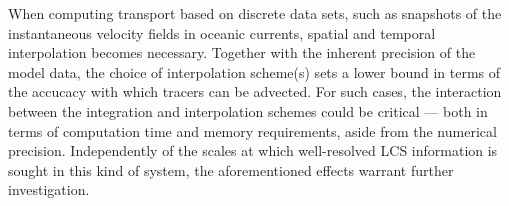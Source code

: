 When computing transport based on discrete data sets, such as snapshots of the
instantaneous velocity fields in oceanic currents, spatial and temporal
interpolation becomes necessary. Together with the inherent precision of the
model data, the choice of interpolation scheme(s) sets a lower bound
in terms of the accucacy with which tracers can be advected. For such cases,
the interaction between the integration and interpolation schemes could
be critical --- both in terms of computation time and memory requirements,
aside from the numerical precision. Independently of the scales at which
well-resolved LCS information is sought in this kind of system, the
aforementioned effects warrant further investigation.
